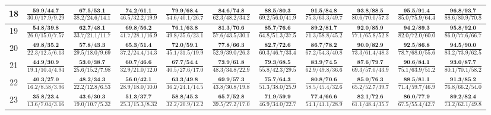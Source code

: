 \documentclass{slides}
\begin{document}
{{{\begin{tabular}{|c|c|c|c|c|c|c|c|c|c|c|}
\hline
18 & $\frac{\textbf{59.9/44.7}}{30.0/17.9/9.29}$ & $\frac{\textbf{67.5/53.1}}{38.2/24.6/14.1}$ & $\frac{\textbf{74.2/61.1}}{46.5/32.2/19.9}$ & $\frac{\textbf{79.9/68.4}}{54.6/40.1/26.7}$ & $\frac{\textbf{84.6/74.8}}{62.3/48.2/34.2}$ & $\frac{\textbf{88.5/80.3}}{69.2/56.0/41.9}$ & $\frac{\textbf{91.5/84.8}}{75.3/63.3/49.7}$ & $\frac{\textbf{93.8/88.5}}{80.6/70.0/57.3}$ & $\frac{\textbf{95.5/91.4}}{85.0/75.9/64.4}$ & $\frac{\textbf{96.8/93.7}}{88.6/80.9/70.8}$ \\
\hline
19 & $\frac{\textbf{54.8/39.8}}{26.0/15.0/7.57}$ & $\frac{\textbf{62.7/48.1}}{33.7/21.1/11.7}$ & $\frac{\textbf{69.8/56.2}}{41.7/28.1/16.9}$ & $\frac{\textbf{76.1/63.8}}{49.8/35.6/23.1}$ & $\frac{\textbf{81.3/70.6}}{57.6/43.5/30.1}$ & $\frac{\textbf{85.7/76.6}}{64.8/51.3/37.5}$ & $\frac{\textbf{89.2/81.7}}{71.3/58.8/45.2}$ & $\frac{\textbf{92.0/85.9}}{77.1/65.8/52.8}$ & $\frac{\textbf{94.2/89.3}}{82.0/72.0/60.0}$ & $\frac{\textbf{95.8/92.0}}{86.0/77.6/66.7}$ \\
\hline
20 & $\frac{\textbf{49.8/35.2}}{22.3/12.5/6.13}$ & $\frac{\textbf{57.8/43.3}}{29.5/18.0/9.69}$ & $\frac{\textbf{65.3/51.4}}{37.2/24.4/14.3}$ & $\frac{\textbf{72.0/59.1}}{45.1/31.5/19.9}$ & $\frac{\textbf{77.8/66.3}}{52.9/39.0/26.3}$ & $\frac{\textbf{82.7/72.6}}{60.3/46.7/33.4}$ & $\frac{\textbf{86.7/78.2}}{67.2/54.3/40.8}$ & $\frac{\textbf{90.0/82.9}}{73.3/61.4/48.3}$ & $\frac{\textbf{92.5/86.8}}{78.7/68.0/55.6}$ & $\frac{\textbf{94.5/90.0}}{83.2/73.9/62.5}$ \\
\hline
21 & $\frac{\textbf{44.9/30.9}}{19.1/10.4/4.94}$ & $\frac{\textbf{53.0/38.7}}{25.6/15.2/7.98}$ & $\frac{\textbf{60.7/46.6}}{32.9/21.0/12.0}$ & $\frac{\textbf{67.7/54.4}}{40.5/27.6/17.0}$ & $\frac{\textbf{73.9/61.8}}{48.3/34.8/22.9}$ & $\frac{\textbf{79.3/68.5}}{55.8/42.3/29.5}$ & $\frac{\textbf{83.9/74.5}}{62.9/49.8/36.6}$ & $\frac{\textbf{87.6/79.7}}{69.3/57.0/43.9}$ & $\frac{\textbf{90.6/84.1}}{75.1/63.9/51.2}$ & $\frac{\textbf{93.0/87.7}}{80.1/70.1/58.2}$ \\
\hline
22 & $\frac{\textbf{40.3/27.0}}{16.2/8.58/3.96}$ & $\frac{\textbf{48.2/34.3}}{22.2/12.8/6.53}$ & $\frac{\textbf{56.0/42.1}}{28.9/18.0/10.0}$ & $\frac{\textbf{63.3/49.8}}{36.2/24.1/14.5}$ & $\frac{\textbf{69.9/57.3}}{43.8/30.8/19.8}$ & $\frac{\textbf{75.7/64.3}}{51.3/38.0/25.9}$ & $\frac{\textbf{80.8/70.6}}{58.5/45.4/32.6}$ & $\frac{\textbf{85.0/76.3}}{65.2/52.7/39.7}$ & $\frac{\textbf{88.5/81.1}}{71.4/59.7/46.9}$ & $\frac{\textbf{91.3/85.2}}{76.8/66.2/54.0}$ \\
\hline
23 & $\frac{\textbf{35.8/23.4}}{13.6/7.04/3.16}$ & $\frac{\textbf{43.6/30.3}}{19.0/10.7/5.32}$ & $\frac{\textbf{51.3/37.7}}{25.3/15.3/8.32}$ & $\frac{\textbf{58.8/45.3}}{32.2/20.9/12.2}$ & $\frac{\textbf{65.7/52.8}}{39.5/27.2/17.0}$ & $\frac{\textbf{71.9/59.9}}{46.9/34.0/22.7}$ & $\frac{\textbf{77.4/66.6}}{54.1/41.1/28.9}$ & $\frac{\textbf{82.1/72.6}}{61.1/48.4/35.7}$ & $\frac{\textbf{86.0/77.9}}{67.5/55.4/42.7}$ & $\frac{\textbf{89.2/82.4}}{73.2/62.1/49.8}$ \\

\end{tabular}}}}
\end{document}
